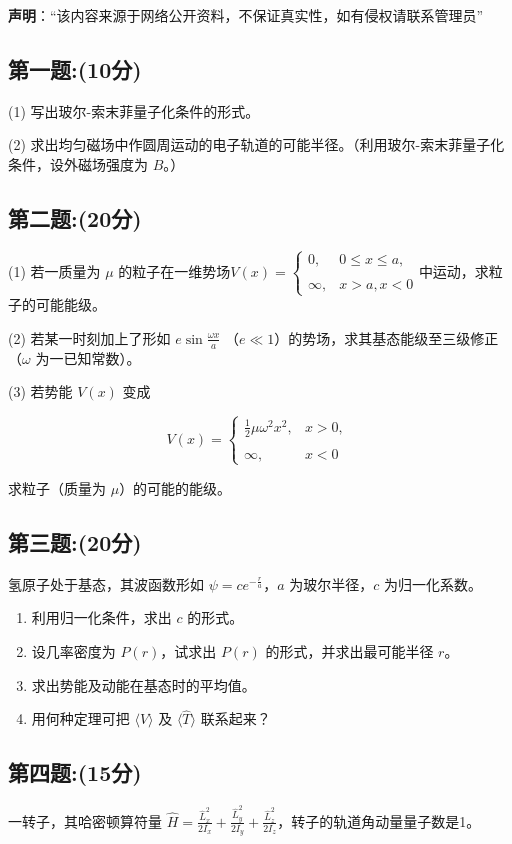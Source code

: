 
\textbf{声明}：“该内容来源于网络公开资料，不保证真实性，如有侵权请联系管理员”

\subsection{第一题:(10分)}
(1) 写出玻尔-索末菲量子化条件的形式。

(2) 求出均匀磁场中作圆周运动的电子轨道的可能半径。（利用玻尔-索末菲量子化条件，设外磁场强度为 $B$。）
\subsection{第二题:(20分)}
(1) 若一质量为 $\mu$ 的粒子在一维势场$V(x) =\begin{cases}    0, & 0 \leq x \leq a, \\\\    \infty, & x > a , x < 0\end{cases}$中运动，求粒子的可能能级。

(2) 若某一时刻加上了形如 $e \sin  \frac{\omega x}{a} $ （$e \ll 1$）的势场，求其基态能级至三级修正（$\omega$ 为一已知常数）。

(3) 若势能 $V(x)$ 变成

$$V(x) =\begin{cases}    \frac{1}{2} \mu \omega^2 x^2, & x > 0, \\\\    \infty, & x < 0\end{cases}~$$

求粒子（质量为 $\mu$）的可能的能级。
\subsection{第三题:(20分)}
氢原子处于基态，其波函数形如 $\psi = c e^{-\frac{r}{a}}$，$a$ 为玻尔半径，$c$ 为归一化系数。

\begin{enumerate}
    \item 利用归一化条件，求出 $c$ 的形式。
    \item 设几率密度为 $P(r)$，试求出 $P(r)$ 的形式，并求出最可能半径 $r$。
    \item 求出势能及动能在基态时的平均值。
    \item 用何种定理可把 $\langle \hat{V} \rangle$ 及 $\langle \hat{T} \rangle$ 联系起来？
\end{enumerate}
\subsection{第四题:(15分)}
一转子，其哈密顿算符量 $\hat{H} = \frac{\hat{L}_x^2}{2I_x} + \frac{\hat{L}_y^2}{2I_y} + \frac{\hat{L}_z^2}{2I_z}$，转子的轨道角动量量子数是1。

